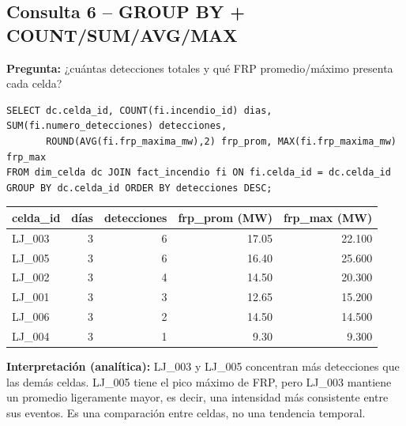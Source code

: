 \documentclass[11pt,a4paper]{article}
\begin{document}
\subsection*{Consulta 6 -- GROUP BY + COUNT/SUM/AVG/MAX}
\textbf{Pregunta:} ¿cu\'antas detecciones totales y qu\'e FRP promedio/m\'aximo presenta cada
celda?
\begin{scriptsize}
\begin{verbatim}
SELECT dc.celda_id, COUNT(fi.incendio_id) dias, SUM(fi.numero_detecciones) detecciones,
       ROUND(AVG(fi.frp_maxima_mw),2) frp_prom, MAX(fi.frp_maxima_mw) frp_max
FROM dim_celda dc JOIN fact_incendio fi ON fi.celda_id = dc.celda_id
GROUP BY dc.celda_id ORDER BY detecciones DESC;
\end{verbatim}
\end{scriptsize}
\vspace{-4pt}
\begin{center}\scriptsize
\begin{tabular}{@{}lrrrr@{}}
\toprule
\textbf{celda\_id} & \textbf{d\'ias} & \textbf{detecciones} & \textbf{frp\_prom (MW)} & \textbf{frp\_max (MW)} \\
\midrule
LJ\_003 & 3 & 6 & 17.05 & 22.100 \\
LJ\_005 & 3 & 6 & 16.40 & 25.600 \\
LJ\_002 & 3 & 4 & 14.50 & 20.300 \\
LJ\_001 & 3 & 3 & 12.65 & 15.200 \\
LJ\_006 & 3 & 2 & 14.50 & 14.500 \\
LJ\_004 & 3 & 1 & 9.30 & 9.300 \\
\bottomrule
\end{tabular}
\end{center}
\vspace{-4pt}
\textbf{Interpretaci\'on (anal\'itica):} LJ\_003 y LJ\_005 concentran m\'as detecciones que las
dem\'as celdas. LJ\_005 tiene el pico m\'aximo de FRP, pero LJ\_003 mantiene un promedio
ligeramente mayor, es decir, una intensidad m\'as consistente entre sus eventos. Es una
comparaci\'on entre celdas, no una tendencia temporal.
\end{document}
